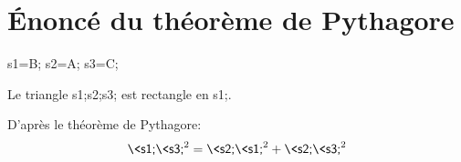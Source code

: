\documentclass[../main.tex]{subfiles}
\begin{document}
    \part{Énoncé du théorème de Pythagore}
    \vspace{20pt}
    \begin{exemple}\par
        \>s1=B;%
        \>s2=A;%
        \>s3=C;%
        \begin{minipage}{.45\linewidth}
        \end{minipage}\hspace{.05\linewidth}
        \begin{minipage}{.45\linewidth}
            Le triangle \textsf{\<s1;\<s2;\<s3;} est rectangle en
            \textsf{\<s1;}.\par
            D'après le théorème de Pythagore:
                $$\textsf{\<s1;\<s3;}^2=\textsf{\<s2;\<s1;}^2+%
                \textsf{\<s2;\<s3;}^2$$
        \end{minipage}
    \end{exemple}\vspace{20pt}
\end{document}
